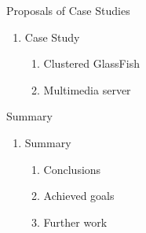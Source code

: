 \documentclass{beamer}
\begin{document}
\begin{frame}{Proposals of Case Studies}

	\begin{enumerate}
		\setcounter{enumi}{\value{enumi_chapter}}

		\item Case Study

			\begin{enumerate}
				\item Clustered GlassFish \pause
				\item Multimedia server
			\end{enumerate}


	
	\end{enumerate}

\end{frame}

\setcounter{enumi_chapter}{\value{enumi}}


\begin{frame}{Summary}

	\begin{enumerate}
		\setcounter{enumi}{\value{enumi_chapter}}

		\item Summary

			\begin{enumerate}
				\item Conclusions \pause
				\item Achieved goals \pause
				\item Further work
			\end{enumerate}

	\end{enumerate}

\end{frame}

\setcounter{enumi_chapter}{\value{enumi}}
\end{document}
